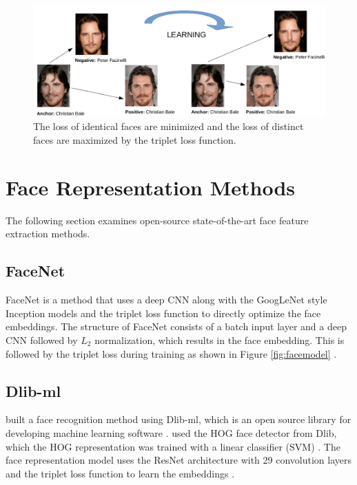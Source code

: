 \documentclass[12pt,english]{article}
\begin{document}
\begin{figure}[!tbp]
 \centering
    \includegraphics[width=\textwidth]{figures/triplet_loss_example.png}
    \caption{The loss of identical faces are minimized and the loss of distinct faces are maximized by the triplet loss function.}
	\label{fig:bale}
\end{figure}
 
\section{Face Representation Methods}

The following section examines open-source state-of-the-art face feature extraction methods.

\subsection{FaceNet}

\quad

FaceNet is a method that uses a deep CNN along with the GoogLeNet style Inception models and the triplet loss function to directly optimize the face embeddings. The structure of FaceNet consists of a batch input layer and a deep CNN followed by $L_{2}$ normalization, which results in the face embedding. This is followed by the triplet loss during training as shown in Figure \ref{fig:facemodel} \cite{schroff}.


\subsection{Dlib-ml}

\cite{geitgey} built a face recognition method using Dlib-ml, which is an open source library for developing machine learning software \cite{king}. \cite{geitgey} used the HOG face detector from Dlib, which the HOG representation was trained with a linear classifier (SVM) \cite{king2014}. The face representation model uses the ResNet architecture with 29 convolution layers and the triplet loss function to learn the embeddings \cite{king2017}. 
\end{document}
